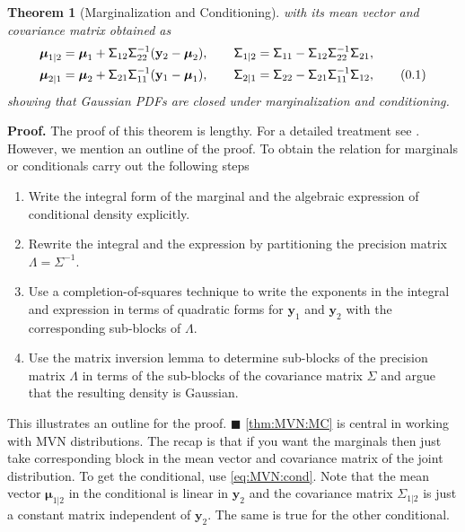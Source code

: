 \documentclass[10pt]{article}
\newtheorem{thm}{Theorem}[section]
\theoremstyle{definition}
\newenvironment{prf}{\noindent\textbf{Proof.}}{\hfill$\blacksquare$}
\newcommand\eqnum{\addtocounter{equation}{1}\tag{\arabic{section}.\arabic{equation}}}
\begin{document}
\begin{thm}[Marginalization and Conditioning]
with its mean vector and covariance matrix obtained as
\begin{align*}
\boldsymbol{\mu}_{1|2} &= \boldsymbol{\mu}_1 + \mathsf{\Sigma}_{12}\mathsf{\Sigma}_{22}^{-1}(\mathbf{y}_2-\boldsymbol{\mu}_2), \qquad
\mathsf{\Sigma}_{1|2} = \mathsf{\Sigma}_{11} - \mathsf{\Sigma}_{12} \mathsf{\Sigma}_{22}^{-1} \mathsf{\Sigma}_{21}, \\
\boldsymbol{\mu}_{2|1} &= \boldsymbol{\mu}_2 + \mathsf{\Sigma}_{21}\mathsf{\Sigma}_{11}^{-1}(\mathbf{y}_1-\boldsymbol{\mu}_1), \qquad
\mathsf{\Sigma}_{2|1} = \mathsf{\Sigma}_{22} - \mathsf{\Sigma}_{21} \mathsf{\Sigma}_{11}^{-1} \mathsf{\Sigma}_{12},
\eqnum
\label{eq:MVN:cond}
\end{align*}
showing that Gaussian PDFs are closed under marginalization and conditioning.
\end{thm}
\begin{prf}
The proof of this theorem is lengthy. For a detailed treatment see \cite{Do2009}. However, we mention an outline of the proof. To obtain the relation for marginals or conditionals carry out the following steps
\begin{enumerate}[noitemsep]
\item Write the integral form of the marginal and the algebraic expression of conditional density explicitly.
\item Rewrite the integral and the expression by partitioning the precision matrix $\mathsf{\Lambda}=\mathsf{\Sigma}^{-1}$.
\item Use a completion-of-squares technique to write the exponents in the integral and  expression in terms of quadratic forms for $\mathbf{y}_1$ and $\mathbf{y}_2$ with the corresponding sub-blocks of $\mathsf{\Lambda}$.
\item Use the matrix inversion lemma to determine sub-blocks of the precision matrix $\mathsf{\Lambda}$ in terms of the sub-blocks of the covariance matrix $\mathsf{\Sigma}$ and argue that the resulting density is Gaussian.
\end{enumerate}
This illustrates an outline for the proof.
\end{prf}
\newline
\indent
\cref{thm:MVN:MC} is central in working with MVN distributions. The recap is that if you want the marginals then just take corresponding block in the mean vector and covariance matrix of the joint distribution. To get the conditional, use \cref{eq:MVN:cond}. Note that the mean vector $\boldsymbol{\mu}_{1|2}$ in the conditional is linear in $\mathbf{y}_2$ and the covariance matrix $\mathsf{\Sigma}_{1|2}$ is just a constant matrix independent of $\mathbf{y}_2$. The same is true for the other conditional.
\end{document}
